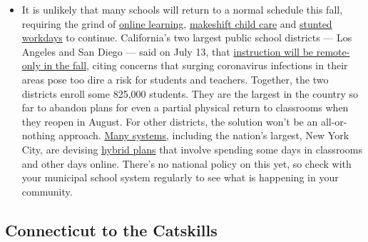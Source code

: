 \begin{itemize}
  \begin{itemize}
  \tightlist
  \item
    It is unlikely that many schools will return to a normal schedule
    this fall, requiring the grind of
    \href{https://www.nytimes.com/2020/06/05/us/coronavirus-education-lost-learning.html?action=click\&pgtype=Article\&state=default\&region=MAIN_CONTENT_3\&context=storylines_faq}{online
    learning},
    \href{https://www.nytimes.com/2020/05/29/us/coronavirus-child-care-centers.html?action=click\&pgtype=Article\&state=default\&region=MAIN_CONTENT_3\&context=storylines_faq}{makeshift
    child care} and
    \href{https://www.nytimes.com/2020/06/03/business/economy/coronavirus-working-women.html?action=click\&pgtype=Article\&state=default\&region=MAIN_CONTENT_3\&context=storylines_faq}{stunted
    workdays} to continue. California's two largest public school
    districts --- Los Angeles and San Diego --- said on July 13, that
    \href{https://www.nytimes.com/2020/07/13/us/lausd-san-diego-school-reopening.html?action=click\&pgtype=Article\&state=default\&region=MAIN_CONTENT_3\&context=storylines_faq}{instruction
    will be remote-only in the fall}, citing concerns that surging
    coronavirus infections in their areas pose too dire a risk for
    students and teachers. Together, the two districts enroll some
    825,000 students. They are the largest in the country so far to
    abandon plans for even a partial physical return to classrooms when
    they reopen in August. For other districts, the solution won't be an
    all-or-nothing approach.
    \href{https://bioethics.jhu.edu/research-and-outreach/projects/eschool-initiative/school-policy-tracker/}{Many
    systems}, including the nation's largest, New York City, are
    devising
    \href{https://www.nytimes.com/2020/06/26/us/coronavirus-schools-reopen-fall.html?action=click\&pgtype=Article\&state=default\&region=MAIN_CONTENT_3\&context=storylines_faq}{hybrid
    plans} that involve spending some days in classrooms and other days
    online. There's no national policy on this yet, so check with your
    municipal school system regularly to see what is happening in your
    community.
  \end{itemize}
\end{itemize}

\hypertarget{connecticut-to-the-catskills}{%
\subsection{Connecticut to the
Catskills}\label{connecticut-to-the-catskills}}

